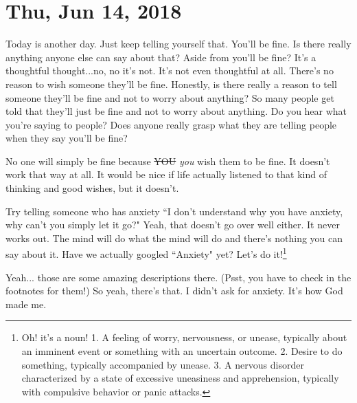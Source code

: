 \section{Thu, Jun 14, 2018}

Today is another day. Just keep telling yourself that. You'll be fine. Is there
really anything anyone else can say about that? Aside from you'll be fine? It's
a thoughtful thought...no, no it's not. It's not even thoughtful at all. There's
no reason to wish someone they'll be fine. Honestly, is there really a reason to
tell someone they'll be fine and not to worry about anything? So many people get
told that they'll just be fine and not to worry about anything. Do you hear what
you're saying to people? Does anyone really grasp what they are telling people
when they say you'll be fine?

No one will simply be fine because \st{YOU} \textit{you} wish them to be fine. 
It doesn't work that way at all. It would be nice if life actually listened to
that kind of thinking and good wishes, but it doesn't.

Try telling someone who has anxiety ``I don't understand why you have anxiety,
why can't you simply let it go?" Yeah, that doesn't go over well either. It
never works out. The mind will do what the mind will do and there's nothing you
can say about it. Have we actually googled ``Anxiety" yet? Let's do
it!\footnote{Oh! it's a noun! 1. A feeling of worry, nervousness, or unease, 
typically about an imminent event or something with an uncertain outcome. 2.
Desire to do something, typically accompanied by unease. 3. A nervous disorder 
characterized by a state of excessive uneasiness and apprehension, 
typically with compulsive behavior or panic attacks.}

Yeah... those are some amazing descriptions there. (Psst, you have to check in
  the footnotes for them!) So yeah, there's that. I didn't ask for anxiety. It's
how God made me.
